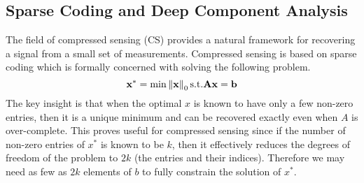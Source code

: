 \subsection{Sparse Coding and Deep Component Analysis}
\label{sec:compr-sens-deep}

The field of compressed sensing (CS) provides a natural framework for recovering a signal from a small set of measurements. Compressed sensing is based on sparse coding which is formally concerned with solving the following problem. 
\begin{equation}
  \label{eq:1}
  \mathbf{x}^* = \min \left\Vert\mathbf{x}\right\Vert_0 \text{s.t.} \mathbf{A}\mathbf{x} = \mathbf{b}
\end{equation}
The key insight is that when the optimal $x$ is known to have only a few non-zero entries, then it is a unique minimum and can be recovered exactly even when $A$ is over-complete. This proves useful for compressed sensing since if the number of non-zero entries of $x^*$ is known to be $k$, then it effectively reduces the degrees of freedom of the problem to $2k$ (the entries and their indices). Therefore we may need as few as $2k$ elements of $b$ to fully constrain the solution of $x^{*}$.\\

